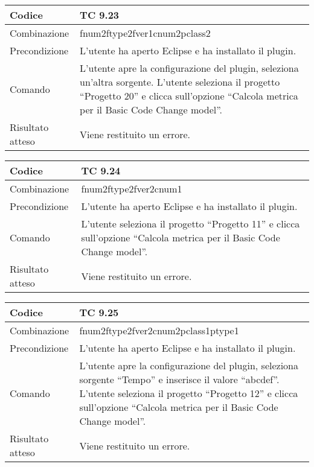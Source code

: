 \begin{table}[ht]
\begin{tabular}{|p{3cm}|p{9cm}|}
\hline
\cellcolor{lightgray}Codice				& TC 9.23								\\
\hline
\cellcolor{lightgray}Combinazione		& fnum2ftype2fver1cnum2pclass2									\\
\hline
\cellcolor{lightgray}Precondizione		& L'utente ha aperto Eclipse e ha installato il plugin.		\\
\hline
\cellcolor{lightgray}Comando			& L'utente apre la configurazione del plugin, seleziona un'altra sorgente. L'utente seleziona il progetto ``Progetto 20''  e clicca sull'opzione ``Calcola metrica per il Basic Code Change model''.	\\
\hline
\cellcolor{lightgray}Risultato atteso	& Viene restituito un errore.\\
\hline
\end{tabular}
\end{table}

\begin{table}[ht]
\begin{tabular}{|p{3cm}|p{9cm}|}
\hline
\cellcolor{lightgray}Codice				& TC 9.24								\\
\hline
\cellcolor{lightgray}Combinazione		& fnum2ftype2fver2cnum1									\\
\hline
\cellcolor{lightgray}Precondizione		& L'utente ha aperto Eclipse e ha installato il plugin.		\\
\hline
\cellcolor{lightgray}Comando			& L'utente seleziona il progetto ``Progetto 11''  e clicca sull'opzione ``Calcola metrica per il Basic Code Change model''.	\\
\hline
\cellcolor{lightgray}Risultato atteso	& Viene restituito un errore.\\
\hline
\end{tabular}
\end{table}

\clearpage

\begin{table}[ht]
\begin{tabular}{|p{3cm}|p{9cm}|}
\hline
\cellcolor{lightgray}Codice				& TC 9.25								\\
\hline
\cellcolor{lightgray}Combinazione		& fnum2ftype2fver2cnum2pclass1ptype1									\\
\hline
\cellcolor{lightgray}Precondizione		& L'utente ha aperto Eclipse e ha installato il plugin.		\\
\hline
\cellcolor{lightgray}Comando			& L'utente apre la configurazione del plugin, seleziona sorgente ``Tempo'' e inserisce il valore ``abcdef''. L'utente seleziona il progetto ``Progetto 12''  e clicca sull'opzione ``Calcola metrica per il Basic Code Change model''.	\\
\hline
\cellcolor{lightgray}Risultato atteso	& Viene restituito un errore.\\
\hline
\end{tabular}
\end{table}

